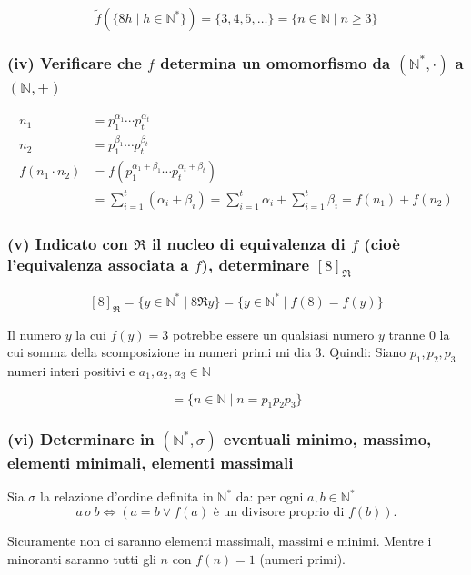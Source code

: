 $$\tilde{f}(\{8h \mid h \in \mathbb{N}^*\}) = \{3, 4, 5, \ldots\} = \{n \in \mathbb{N} \mid n \geq 3\}$$

\subsubsection*{(iv) Verificare che $f$ determina un omomorfismo da $(\mathbb{N}^*, \cdot)$ a $(\mathbb{N}, +)$}

\begin{align*}
n_1 &= p_1^{\alpha_1} \cdots p_t^{\alpha_t} \\
n_2 &= p_1^{\beta_1} \cdots p_t^{\beta_t} \\
f(n_1 \cdot n_2) &= f(p_1^{\alpha_1 + \beta_1} \cdots p_t^{\alpha_t + \beta_t}) \\
&= \sum_{i=1}^{t} (\alpha_i + \beta_i) = \sum_{i=1}^{t} \alpha_i + \sum_{i=1}^{t} \beta_i = f(n_1) + f(n_2)
\end{align*}


\subsubsection*{(v) Indicato con $\Re$ il nucleo di equivalenza di $f$ (cioè l'equivalenza associata a $f$), determinare $[8]_\Re$}

$$[8]_{\Re} = \{y \in \mathbb{N}^* \mid 8 \Re y\} = \{y \in \mathbb{N}^* \mid f(8) = f(y)\}$$

Il numero $y$ la cui $f(y) = 3$ potrebbe essere un qualsiasi numero $y$ tranne 0 la cui somma della scomposizione in numeri primi mi dia 3. Quindi:
Siano $p_1, p_2, p_3$ numeri interi positivi e $a_1, a_2, a_3 \in \mathbb{N}$

$$= \{n \in \mathbb{N} \mid n = p_1 p_2 p_3\}$$

\subsubsection*{(vi) Determinare in $(\mathbb{N}^*, \sigma)$ eventuali minimo, massimo, elementi minimali, elementi massimali}

Sia $\sigma$ la relazione d'ordine definita in $\mathbb{N}^*$ da: per ogni $a, b \in \mathbb{N}^*$
$$a \,\sigma\, b \Longleftrightarrow (a = b \lor f(a) \text{ è un divisore proprio di } f(b)).$$

Sicuramente non ci saranno elementi massimali, massimi e minimi. Mentre i minoranti saranno tutti gli $n$ con $f(n) = 1$ (numeri primi).

